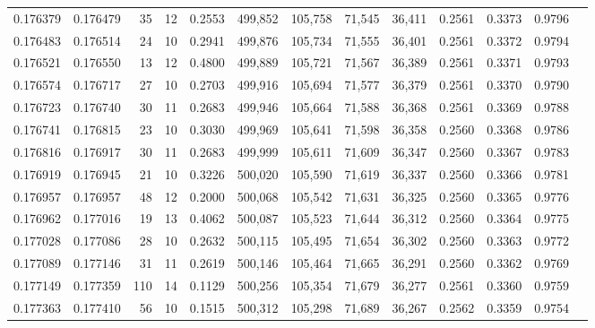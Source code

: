\begin{tabular}{rrrrrrrrrrrrr}
0.176379 & 0.176479 &    35 &  12 &                                     0.2553 & 499,852 & 105,758 &  71,545 &  36,411 & 0.2561 & 0.3373 & 0.9796 \\
0.176483 & 0.176514 &    24 &  10 &                                     0.2941 & 499,876 & 105,734 &  71,555 &  36,401 & 0.2561 & 0.3372 & 0.9794 \\
0.176521 & 0.176550 &    13 &  12 &                                     0.4800 & 499,889 & 105,721 &  71,567 &  36,389 & 0.2561 & 0.3371 & 0.9793 \\
0.176574 & 0.176717 &    27 &  10 &                                     0.2703 & 499,916 & 105,694 &  71,577 &  36,379 & 0.2561 & 0.3370 & 0.9790 \\
0.176723 & 0.176740 &    30 &  11 &                                     0.2683 & 499,946 & 105,664 &  71,588 &  36,368 & 0.2561 & 0.3369 & 0.9788 \\
0.176741 & 0.176815 &    23 &  10 &                                     0.3030 & 499,969 & 105,641 &  71,598 &  36,358 & 0.2560 & 0.3368 & 0.9786 \\
0.176816 & 0.176917 &    30 &  11 &                                     0.2683 & 499,999 & 105,611 &  71,609 &  36,347 & 0.2560 & 0.3367 & 0.9783 \\
0.176919 & 0.176945 &    21 &  10 &                                     0.3226 & 500,020 & 105,590 &  71,619 &  36,337 & 0.2560 & 0.3366 & 0.9781 \\
0.176957 & 0.176957 &    48 &  12 &                                     0.2000 & 500,068 & 105,542 &  71,631 &  36,325 & 0.2560 & 0.3365 & 0.9776 \\
0.176962 & 0.177016 &    19 &  13 &                                     0.4062 & 500,087 & 105,523 &  71,644 &  36,312 & 0.2560 & 0.3364 & 0.9775 \\
0.177028 & 0.177086 &    28 &  10 &                                     0.2632 & 500,115 & 105,495 &  71,654 &  36,302 & 0.2560 & 0.3363 & 0.9772 \\
0.177089 & 0.177146 &    31 &  11 &                                     0.2619 & 500,146 & 105,464 &  71,665 &  36,291 & 0.2560 & 0.3362 & 0.9769 \\
0.177149 & 0.177359 &   110 &  14 &                                     0.1129 & 500,256 & 105,354 &  71,679 &  36,277 & 0.2561 & 0.3360 & 0.9759 \\
0.177363 & 0.177410 &    56 &  10 &                                     0.1515 & 500,312 & 105,298 &  71,689 &  36,267 & 0.2562 & 0.3359 & 0.9754 \\

\end{tabular}
